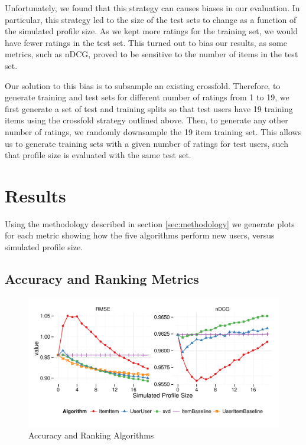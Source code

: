 \documentclass[letterpaper]{sig-alternate}
\begin{document}
  Unfortunately, we found that this strategy can causes biases in our evaluation.
  In particular, this strategy led to the size of the test sets to change as a function of the simulated profile size.
  As we kept more ratings for the training set, we would have fewer ratings in the test set.
  This turned out to bias our results, as some metrics, such as nDCG, proved to be sensitive to the number of items in the test set.
  
  Our solution to this bias is to subsample an existing crossfold.
  Therefore, to generate training and test sets for different number of ratings from 1 to 19, we first generate a set of test and training splits so that test users have 19 training items using the crossfold strategy outlined above.
  Then, to generate any other number of ratings, we randomly downsample the 19 item training set.
  This allows us to generate training sets with a given number of ratings for test users, such that profile size is evaluated with the same test set.


\section{Results}

  Using the methodology described in section \ref{sec:methodology} we generate plots for each metric showing how the five algorithms perform new users, versus simulated profile size.

  
\subsection*{Accuracy and Ranking Metrics}

\begin{figure}[ht!]
  \centering
  \includegraphics[width=0.75\linewidth]{../lenskit/output/ekstrandTuned20/accuracy.pdf}
  \caption{Accuracy and Ranking Algorithms}
  \label{fig:rmse}
  \label{fig:ndcg}
\end{figure}
\end{document}
